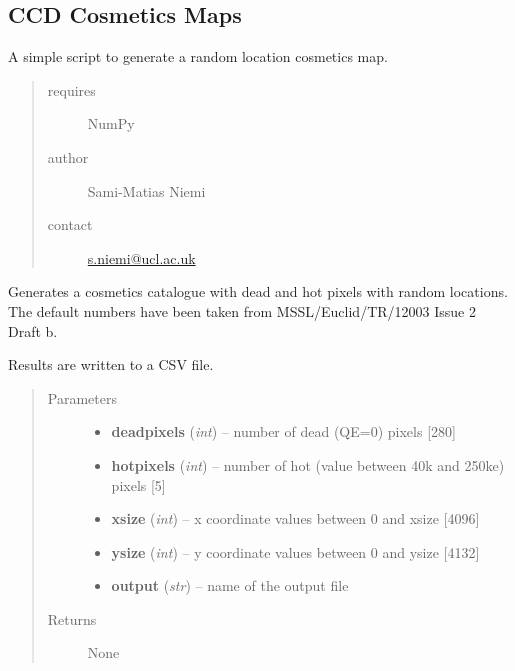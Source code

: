 \documentclass[a4paper,11pt,english]{sphinxmanual}
\begin{document}
\label{support:module-support.cosmeticsMap}

\subsection{CCD Cosmetics Maps}
\label{support:ccd-cosmetics-maps}
A simple script to generate a random location cosmetics map.
\begin{quote}\begin{description}
\item[{requires}] \leavevmode
NumPy

\item[{author}] \leavevmode
Sami-Matias Niemi

\item[{contact}] \leavevmode
\href{mailto:s.niemi@ucl.ac.uk}{s.niemi@ucl.ac.uk}

\end{description}\end{quote}

\begin{fulllineitems}
\label{support:support.cosmeticsMap.generateCatalogue}
Generates a cosmetics catalogue with dead and hot pixels with random locations.
The default numbers have been taken from MSSL/Euclid/TR/12003 Issue 2 Draft b.

Results are written to a CSV file.
\begin{quote}\begin{description}
\item[{Parameters}] \leavevmode\begin{itemize}
\item {} 
\textbf{deadpixels} (\emph{int}) -- number of dead (QE=0) pixels {[}280{]}

\item {} 
\textbf{hotpixels} (\emph{int}) -- number of hot (value between 40k and 250ke) pixels {[}5{]}

\item {} 
\textbf{xsize} (\emph{int}) -- x coordinate values between 0 and xsize {[}4096{]}

\item {} 
\textbf{ysize} (\emph{int}) -- y coordinate values between 0 and ysize {[}4132{]}

\item {} 
\textbf{output} (\emph{str}) -- name of the output file

\end{itemize}

\item[{Returns}] \leavevmode
None

\end{description}\end{quote}

\end{fulllineitems}
\end{document}

